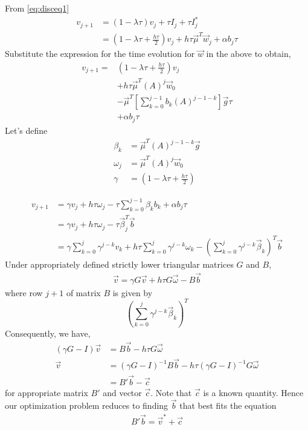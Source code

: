 \documentclass{ifacconf}
\begin{document}
From \eqref{eq:disceq1}
\begin{align}
v_{j+1} &= (1-\lambda \tau)v_j + \tau I_j + \tau I_j^{*} \\
&= (1-\lambda \tau + \frac{h\tau}{2})v_j + h\tau\vec{\mu}^T\vec{w}_j + \alpha b_j\tau
\end{align}
Substitute the expression for the time evolution for $\vec{w}$ in the above to obtain,
\begin{align*}
v_{j+1} =& (1-\lambda \tau+ \frac{h\tau}{2})v_j \\
         & + h\tau\vec{\mu}^T(A)^{j}\vec{w}_0 \\
	 & - \vec{\mu}^T\left[ \sum_{k=0}^{j-1} b_{k}(A)^{j-1-k} \right]\vec{g}\tau\\
	 & + \alpha b_j\tau
\end{align*}
Let's define 
\begin{align}
	\beta_k  &= \vec{\mu}^T (A)^{j-1-k}\vec{g} \\
        \omega_j &=\vec{\mu}^T(A)^{j}\vec{w}_0 \\
        \gamma   &=(1-\lambda \tau+ \frac{h\tau}{2})
\end{align}

\begin{align} \label{eq:p0evolution}
v_{j+1} &= \gamma v_j + h\tau\omega_j - \tau\sum_{k=0}^{j-1}\beta_kb_k
	   + \alpha b_j\tau \\
	   &= \gamma v_j + h\tau\omega_j - \tau \vec{\beta}_j^T \vec{b}\\
	   &= \gamma \sum_{k=0}^{j} \gamma^{j-k}v_k 
	   + h\tau\sum_{k=0}^{j} \gamma^{j-k}\omega_k
	   - \left(\sum_{k=0}^{j} \gamma^{j-k} \vec{\beta}_k\right)^T \vec{b}
\end{align}
Under appropriately defined strictly lower triangular matrices $G$ and $B$,
\begin{align}
	\vec{v} = \gamma G\vec{v} + h\tau G\vec{\omega} - B\vec{b}
\end{align}
where row $j+1$ of matrix $B$ is given by
\[
\left(\sum_{k=0}^{j} \gamma^{j-k} \vec{\beta}_k\right)^T
\]
Consequently, we have,
\begin{align}
	(\gamma G - I)\vec{v} &= B\vec{b} - h\tau G\vec{\omega} \\
	\vec{v} &= (\gamma G - I)^{-1}B\vec{b} - h\tau(\gamma G - I)^{-1}G\vec{\omega}\\
		&= B'\vec{b} - \vec{c}
\end{align}
for appropriate matrix $B'$ and vector $\vec{c}$. Note that $\vec{c}$ is a known quantity.
Hence our optimization problem reduces to finding $\vec{b}$ that best fits the equation
\begin{align}
	B'\vec{b} = \vec{v}^* + \vec{c}
\end{align}
\end{document}
